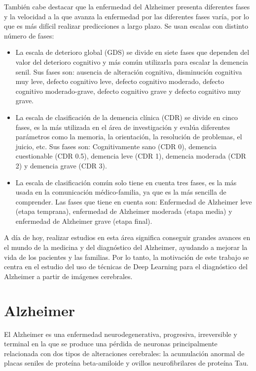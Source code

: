 También cabe destacar que la enfermedad del Alzheimer presenta diferentes fases y la velocidad a la que avanza la
enfermedad por las diferentes fases varía, por lo que es más difícil realizar predicciones a largo plazo.
Se usan escalas con distinto número de fases:
\begin{itemize}
    \item La escala de deterioro global (GDS) se divide en siete fases que dependen del valor del deterioro cognitivo y
    más común utilizarla para escalar la demencia senil.
    Sus fases son: ausencia de alteración cognitiva, disminución cognitiva muy leve, defecto cognitivo leve, defecto
    cognitivo moderado, defecto cognitivo moderado-grave, defecto cognitivo grave y defecto cognitivo muy grave.
    \item La escala de clasificación de la demencia clínica (CDR)  se divide en cinco fases, es la más utilizada en el
    área de investigación y evalúa diferentes parámetros como la memoria, la orientación, la resolución de problemas,
    el juicio, etc.
    Sus fases son: Cognitivamente sano (CDR 0), demencia cuestionable (CDR 0.5), demencia leve (CDR 1), demencia
    moderada (CDR 2) y demencia grave (CDR 3).
    \item La escala de clasificación común solo tiene en cuenta tres fases, es la más usada en la comunicación
    médico-familia, ya que es la más sencilla de comprender.
    Las fases que tiene en cuenta son: Enfermedad de Alzheimer leve (etapa temprana), enfermedad de Alzheimer moderada
    (etapa media) y enfermedad de Alzheimer grave (etapa final).\\
\end{itemize}

A día de hoy, realizar estudios en esta área significa conseguir grandes avances en el mundo de la medicina y del
diagnóstico del Alzheimer, ayudando a mejorar la vida de los pacientes y las familias.
Por lo tanto, la motivación de este trabajo se centra en el estudio del uso de técnicas de Deep Learning para el
diagnóstico del Alzheimer a partir de imágenes cerebrales.

\section{Alzheimer}\label{sec:alzheimer}
El Alzheimer es una enfermedad neurodegenerativa, progresiva, irreversible y terminal en la que se produce una pérdida
de neuronas principalmente relacionada con dos tipos de alteraciones cerebrales: la acumulación anormal de placas
seniles de proteína beta-amiloide y ovillos neurofibrilares de proteína Tau.

